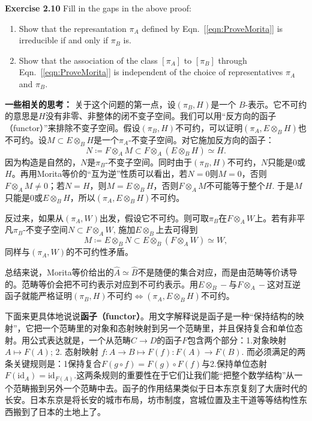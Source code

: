 \textbf{Exercise 2.10} Fill in the gaps in the above proof:
\begin{enumerate}
    \item Show that the represantation $\pi_A$ defined by Eqn.~[\ref{eqn:ProveMorita}] is irreducible if and only if $\pi_B$ is.
    \item Show that the association of the class $[\pi_A]$ to $[\pi_B]$ through Eqn.~[\ref{eqn:ProveMorita}] is independent of the choice of representatives $\pi_A$ and $\pi_B$.
\end{enumerate}
\textbf{一些相关的思考：} 关于这个问题的第一点，设$(\pi_B,H)$是一个 $B$-表示。它不可约的意思是$H$没有非零、非整体的闭不变子空间。我们可以用“反方向的函子（functor）”来排除不变子空间。假设$(\pi_B,H)$不可约，可以证明$(\pi_A,E\otimes_BH)$也不可约。设$M\subset E\otimes_BH$是一个$\pi_A$-不变子空间。对它施加反方向的函子：
\[
N\coloneq F\otimes_AM\subset F\otimes_A(E\otimes_BH)\simeq H.
\]
因为构造是自然的，$N$是$\pi_B$-不变子空间。同时由于$(\pi_B,H)$不可约，$N$只能是0或$H$。再用Morita等价的“互为逆”性质可以看出，若$N=0$则$M=0$，否则$F\otimes_AM\neq0$；若$N=H$，则$M=E\otimes_BH$，否则$F\otimes_AM$不可能等于整个$H$. 于是$M$只能是0或$E\otimes_BH$，所以$(\pi_A,E\otimes_BH)$不可约。

反过来，如果从$(\pi_A,W)$出发，假设它不可约。则可取$\pi_B$在$F\otimes_AW$上。若有非平凡$\pi_B$-不变子空间$N\subset F\otimes_AW$, 施加$E\otimes_B$上去可得到
\[
M\coloneq E\otimes_BN\subset E\otimes_B(F\otimes_AW)\simeq W,
\]
同样与$(\pi_A, W)$的不可约性矛盾。

总结来说，Morita等价给出的$\hat{A}\simeq\hat{B}$不是随便的集合对应，而是由范畴等价诱导的。范畴等价会把不可约表示对应到不可约表示。用$E\otimes_B-$与$F\otimes_A-$这对互逆函子就能严格证明$(\pi_B,H)$不可约$\Leftrightarrow(\pi_A,E\otimes_BH)$不可约。 

下面来更具体地说说\textbf{函子（functor）}。用文字解释说是函子是一种“保持结构的映射”，它把一个范畴里的对象和态射映射到另一个范畴里，并且保持复合和单位态射。用公式表达就是，一个从范畴$C\rightarrow D$的函子$F$包含两个部分：1.对象映射$A\mapsto F(A)$; 2. 态射映射 $f:A\rightarrow B\mapsto F(f):F(A)\rightarrow F(B)$. 而必须满足的两条关键规则是：1保持复合$F(g\circ f)=F(g)\circ F(f)$与2.保持单位态射$F(\text{id}_A)=\text{id}_{F(A)}$.这两条规则的重要性在于它们让我们能“把整个数学结构”从一个范畴搬到另外一个范畴中去。函子的作用结果类似于日本东京复刻了大唐时代的长安。日本东京是将长安的城市布局，坊市制度，宫城位置及主干道等等结构性东西搬到了日本的土地上了。


